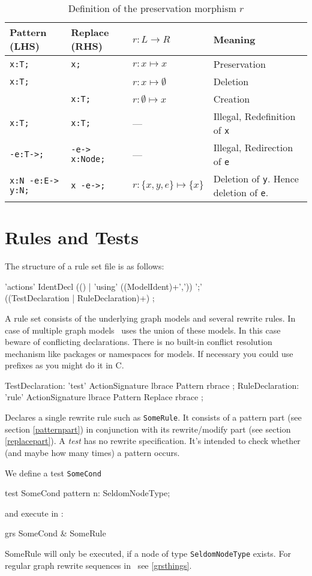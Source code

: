 \begin{table}[htbp]
\centering
\begin{tabularx}{\linewidth}{lllX}
  \textbf{Pattern (LHS)} & \textbf{Replace (RHS)} & \textbf{$r: L \longrightarrow R$} & \textbf{Meaning} \\ \hline 
  \texttt{x:T;} & \texttt{x;} & $r:x \mapsto x$ & Preservation \\
  \texttt{x:T;} & \texttt{} & $r:x \mapsto \emptyset$ & Deletion \\
  \texttt{} & \texttt{x:T;} & $r:\emptyset \mapsto x$ & Creation \\
  \texttt{x:T;} & \texttt{x:T;} & --- & Illegal, Redefinition of \texttt{x} \\
  \texttt{-e:T->;} & \texttt{-e-> x:Node;} & --- & Illegal, Redirection of \texttt{e} \\
  \texttt{x:N -e:E-> y:N;} & \texttt{x -e->;} & $r:\{x,y,e\} \mapsto \{x\}$ & Deletion of \texttt{y}. Hence deletion of \texttt{e}. \\
\end{tabularx}
\caption{Definition of the preservation morphism $r$}
\label{rule:impldefinition}
\end{table}

\section{Rules and Tests}
\label{ruledecls}
The structure of a rule set file is as follows:
\begin{rail}
  'actions' IdentDecl (() | 'using' ((ModelIdent)+',')) ';' \\ ((TestDeclaration | RuleDeclaration)+) ;
\end{rail}
A rule set consists of the underlying graph models and several rewrite rules. In case of multiple graph models \GrG\ uses the union of these models. In this case beware of conflicting declarations. There is no built-in conflict resolution mechanism like packages or namespaces for models. If necessary you could use prefixes as you might do it in C.

\begin{rail}
  TestDeclaration: 'test' ActionSignature lbrace Pattern rbrace ;
  RuleDeclaration: 'rule' ActionSignature lbrace Pattern Replace rbrace ;
\end{rail}
Declares a single rewrite rule such as \texttt{SomeRule}. It consists of a pattern part (see section \ref{patternpart}) in conjunction with its rewrite/modify part (see section \ref{replacepart}). A \emph{test} has no rewrite specification. It's intended to check whether (and maybe how many times) a pattern occurs.
\begin{example}
We define a test \texttt{SomeCond}
\begin{grgen}
test SomeCond {
  pattern {
    n: SeldomNodeType;
  }
}
\end{grgen}
and execute in \GrShell:
\begin{grshell}
  grs SomeCond & SomeRule
\end{grshell}
SomeRule will only be executed, if a node of type \texttt{SeldomNodeType} exists. For regular graph rewrite sequences in \GrShell\ see \ref{grsthings}.
\end{example}

